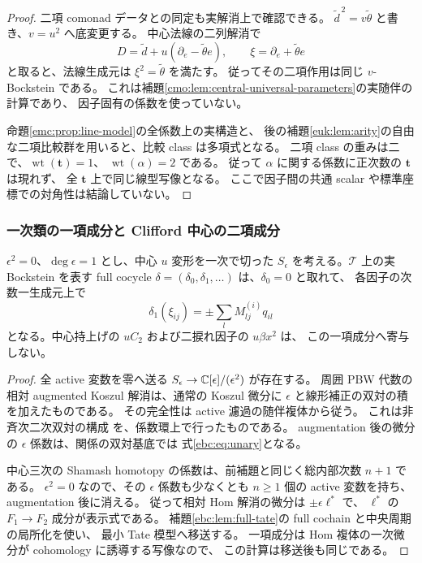 \begin{proof}
二項 comonad データとの同定も実解消上で確認できる。
$\widetilde d^{\,2}=v\widetilde\theta$ と書き、$v=u^2$ へ底変更する。
中心法線の二列解消で
\[
 D=\widetilde d+u(\partial_e-\widetilde\theta e),\qquad
 \xi=\partial_e+\widetilde\theta e
\]
と取ると、法線生成元は $\xi^2=\widetilde\theta$ を満たす。
従ってその二項作用は同じ $v$-Bockstein である。
これは補題\ref{cmo:lem:central-universal-parameters}の実随伴の計算であり、
因子固有の係数を使っていない。

命題\ref{emc:prop:line-model}の全係数上の実構造と、
後の補題\ref{euk:lem:arity}の自由な二項比較群を用いると、比較 class は多項式となる。
二項 class の重みは二で、$\operatorname{wt}(\mathbf t)=1$、
$\operatorname{wt}(\alpha)=2$ である。
従って $\alpha$ に関する係数に正次数の $\mathbf t$ は現れず、
全 $\mathbf t$ 上で同じ線型写像となる。
ここで因子間の共通 scalar や標準座標での対角性は結論していない。
\end{proof}

\subsubsection{一次類の一項成分と Clifford 中心の二項成分}

\begin{lemma}
\label{ebc:lem:unary}
$\epsilon^2=0$、$\deg\epsilon=1$ とし、中心 $u$ 変形を一次で切った
$S_\epsilon$ を考える。$\mathcal T$ 上の実 Bockstein を表す full cocycle
$\delta=(\delta_0,\delta_1,\ldots)$ は、$\delta_0=0$ と取れて、
各因子の次数一生成元上で
\begin{equation}\label{ebc:eq:unary}
                 \delta_1(\xi_{ij})=\pm\sum_l M^{(i)}_{lj}q_{il}
\end{equation}
となる。中心持上げの $uC_2$ および二捩れ因子の $u\beta x^2$ は、
この一項成分へ寄与しない。
\end{lemma}

\begin{proof}
全 active 変数を零へ送る $S_\epsilon\to\mathbb C[\epsilon]/(\epsilon^2)$ が存在する。
周囲 PBW 代数の相対 augmented Koszul 解消は、通常の Koszul 微分に
$\epsilon$ と線形補正の双対の積を加えたものである。
その完全性は active 濾過の随伴複体から従う。
これは非斉次二次双対の構成
\cite[\S\S2.1--2.5]{CMOPositselskiQL}を、係数環上で行ったものである。
augmentation 後の微分の $\epsilon$ 係数は、関係の双対基底では
式\eqref{ebc:eq:unary}となる。

中心三次の Shamash homotopy の係数は、前補題と同じく総内部次数 $n+1$ である。
$\epsilon^2=0$ なので、その $\epsilon$ 係数も少なくとも $n\ge1$ 個の
active 変数を持ち、augmentation 後に消える。
従って相対 Hom 解消の微分は $\pm\epsilon\ell^*$ で、
$\ell^*$ の $F_1\to F_2$ 成分が表示式である。
補題\ref{ebc:lem:full-tate}の full cochain と中央周期の局所化を使い、
最小 Tate 模型へ移送する。
一項成分は Hom 複体の一次微分が cohomology に誘導する写像なので、
この計算は移送後も同じである。
\end{proof}

